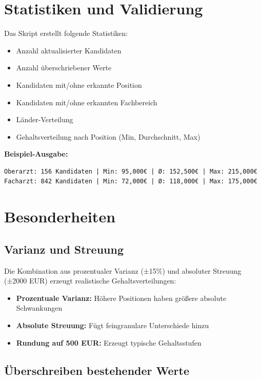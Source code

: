 \documentclass[12pt,a4paper]{article}
\begin{document}
\section{Statistiken und Validierung}

Das Skript erstellt folgende Statistiken:
\begin{itemize}
    \item Anzahl aktualisierter Kandidaten
    \item Anzahl überschriebener Werte
    \item Kandidaten mit/ohne erkannte Position
    \item Kandidaten mit/ohne erkannten Fachbereich
    \item Länder-Verteilung
    \item Gehaltsverteilung nach Position (Min, Durchschnitt, Max)
\end{itemize}

\textbf{Beispiel-Ausgabe:}
\begin{verbatim}
Oberarzt: 156 Kandidaten | Min: 95,000€ | Ø: 152,500€ | Max: 215,000€
Facharzt: 842 Kandidaten | Min: 72,000€ | Ø: 118,000€ | Max: 175,000€
\end{verbatim}

\section{Besonderheiten}

\subsection{Varianz und Streuung}

Die Kombination aus prozentualer Varianz (±15\%) und absoluter Streuung (±2000 EUR) erzeugt realistische Gehaltsverteilungen:
\begin{itemize}
    \item \textbf{Prozentuale Varianz:} Höhere Positionen haben größere absolute Schwankungen
    \item \textbf{Absolute Streuung:} Fügt feingranulare Unterschiede hinzu
    \item \textbf{Rundung auf 500 EUR:} Erzeugt typische Gehaltsstufen
\end{itemize}

\subsection{Überschreiben bestehender Werte}
\end{document}
